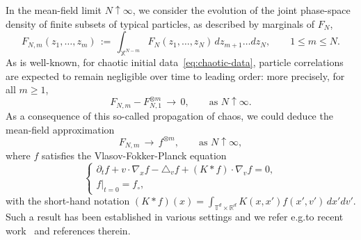 \documentclass[a4paper,11pt,reqno,noindent]{amsart}
\theoremstyle{plain}
\theoremstyle{definition}
\numberwithin{equation}{section}
\newcommand{\Xd}{\mathbb X}
\newcommand{\R}{\mathbb R}
\newcommand{\T}{\mathbb T}
\begin{document}
In the mean-field limit $N\uparrow\infty$, we consider the evolution of the joint phase-space density of finite subsets of typical particles, as described by marginals of $F_N$,
\[F_{N,m}(z_1,\ldots,z_m)\,:=\,\int_{\Xd^{N-m}}F_N(z_1,\ldots,z_N)\,dz_{m+1}\ldots dz_N,\qquad 1\le m\le N.\]
As is well-known, for chaotic initial data~\eqref{eq:chaotic-data}, particle correlations are expected to remain negligible over time to leading order: more precisely, for all $m\ge1$,
\[F_{N,m}-F_{N,1}^{\otimes m}\,\to\,0,\qquad\text{as $N\uparrow\infty$}.\]
As a consequence of this so-called propagation of chaos, we could deduce the mean-field approximation
\begin{equation}\label{eq:MFlim}
F_{N,m}\,\to\,f^{\otimes m},\qquad\text{as $N\uparrow\infty$},
\end{equation}
where $f$ satisfies the Vlasov-Fokker-Planck equation
\begin{equation}\label{eq:VFP}
\left\{\begin{array}{l}
\partial_tf+v\cdot\nabla_xf-\triangle_vf+(K\ast f)\cdot\nabla_vf=0,\\
f|_{t=0}=f_\circ,
\end{array}\right.
\end{equation}
with the short-hand notation $(K\ast f)(x)=\int_{\T^d\times\R^d}K(x,x')f(x',v')\,dx'dv'$. Such a result has been established in various settings and we refer e.g.\@ to recent work~\cite{BJS-22} and references therein.
\end{document}
